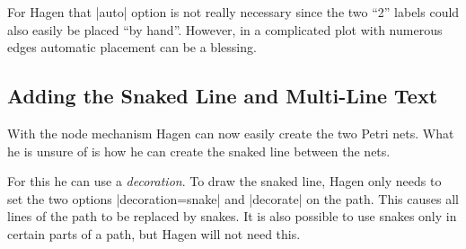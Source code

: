 For Hagen that |auto| option is not really necessary since the two ``2'' labels
could also easily be placed ``by hand''. However, in a complicated plot with
numerous edges automatic placement can be a blessing.
%
\begin{codeexample}[
    preamble={\usetikzlibrary{arrows.meta,positioning}},
    pre={\tikzset{
    pre/.style={<-,shorten <=1pt,>={Stealth[round]},semithick},
    post/.style={->,shorten >=1pt,>={Stealth[round]},semithick},
}},
]
\end{codeexample}


\subsection{Adding the Snaked Line and Multi-Line Text}

With the node mechanism Hagen can now easily create the two Petri nets. What he
is unsure of is how he can create the snaked line between the nets.

For this he can use a \emph{decoration}. To draw the snaked line, Hagen only
needs to set the two options |decoration=snake| and |decorate| on the path.
This causes all lines of the path to be replaced by snakes. It is also possible
to use snakes only in certain parts of a path, but Hagen will not need this.
%
\begin{codeexample}[preamble={\usetikzlibrary{decorations.pathmorphing}}]
\end{codeexample}

